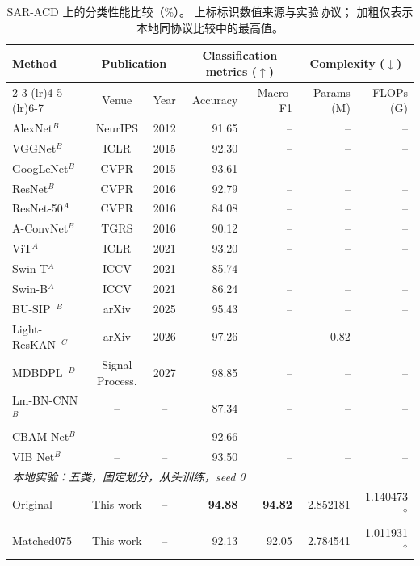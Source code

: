 \begin{table}[!t]
\centering
\small
\setlength{\tabcolsep}{4pt}
\renewcommand{\arraystretch}{1.10}
\caption{SAR-ACD 上的分类性能比较（\%）。
上标标识数值来源与实验协议；
加粗仅表示本地同协议比较中的最高值。}
\label{tab:saracd_performance}
\begin{tabular*}{\textwidth}{@{\extracolsep{\fill}}lccrrrr}
\toprule
\multirow{2}{*}{Method}
& \multicolumn{2}{c}{Publication}
& \multicolumn{2}{c}{Classification metrics ($\uparrow$)}
& \multicolumn{2}{c}{Complexity ($\downarrow$)} \\
\cmidrule(lr){2-3}
\cmidrule(lr){4-5}
\cmidrule(lr){6-7}
& Venue & Year
& Accuracy & Macro-F1
& Params (M) & FLOPs (G) \\
\midrule
AlexNet$^{B}$
& NeurIPS & 2012
& 91.65 & -- & -- & -- \\
VGGNet$^{B}$
& ICLR & 2015
& 92.30 & -- & -- & -- \\
GoogLeNet$^{B}$
& CVPR & 2015
& 93.61 & -- & -- & -- \\
ResNet$^{B}$
& CVPR & 2016
& 92.79 & -- & -- & -- \\
ResNet-50$^{A}$
& CVPR & 2016
& 84.08 & -- & -- & -- \\
A-ConvNet$^{B}$
& TGRS & 2016
& 90.12 & -- & -- & -- \\
ViT$^{A}$
& ICLR & 2021
& 93.20 & -- & -- & -- \\
Swin-T$^{A}$
& ICCV & 2021
& 85.74 & -- & -- & -- \\
Swin-B$^{A}$
& ICCV & 2021
& 86.24 & -- & -- & -- \\
BU-SIP~\cite{busip2025}$^{B}$
& arXiv & 2025
& 95.43 & -- & -- & -- \\
Light-ResKAN~\cite{lightreskan2026}$^{C}$
& arXiv & 2026
& 97.26 & -- & 0.82 & -- \\
MDBDPL~\cite{mdbdpl2027}$^{D}$
& Signal Process. & 2027
& 98.85 & -- & -- & -- \\
Lm-BN-CNN$^{B}$
& -- & --
& 87.34 & -- & -- & -- \\
CBAM Net$^{B}$
& -- & --
& 92.66 & -- & -- & -- \\
VIB Net$^{B}$
& -- & --
& 93.50 & -- & -- & -- \\
\midrule
\multicolumn{7}{l}{
\textit{本地实验：五类，固定划分，从头训练，seed 0}} \\
Original
& This work & --
& \textbf{94.88} & \textbf{94.82} & 2.852181 & 1.140473$^{\diamond}$ \\
Matched075
& This work & --
& 92.13 & 92.05 & 2.784541 & 1.011931$^{\diamond}$ \\

\end{tabular*}
\end{table}
